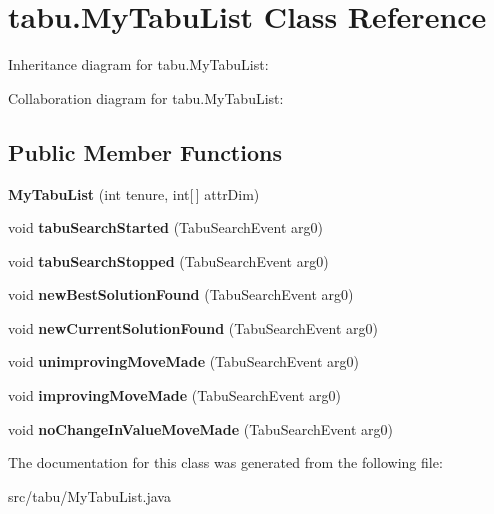 \hypertarget{classtabu_1_1_my_tabu_list}{}\section{tabu.\+My\+Tabu\+List Class Reference}
\label{classtabu_1_1_my_tabu_list}


Inheritance diagram for tabu.\+My\+Tabu\+List\+:


Collaboration diagram for tabu.\+My\+Tabu\+List\+:
\subsection*{Public Member Functions}
\begin{DoxyCompactItemize}
\item 
{\bfseries My\+Tabu\+List} (int tenure, int\mbox{[}$\,$\mbox{]} attr\+Dim)\hypertarget{classtabu_1_1_my_tabu_list_a2dbf5a25966852f04901f963e53a556f}{}\label{classtabu_1_1_my_tabu_list_a2dbf5a25966852f04901f963e53a556f}

\item 
void {\bfseries tabu\+Search\+Started} (Tabu\+Search\+Event arg0)\hypertarget{classtabu_1_1_my_tabu_list_a5c320a69d2ebd5521b5d341af99e1e30}{}\label{classtabu_1_1_my_tabu_list_a5c320a69d2ebd5521b5d341af99e1e30}

\item 
void {\bfseries tabu\+Search\+Stopped} (Tabu\+Search\+Event arg0)\hypertarget{classtabu_1_1_my_tabu_list_a9600db348f7fe71290c1f7c6c57c82bc}{}\label{classtabu_1_1_my_tabu_list_a9600db348f7fe71290c1f7c6c57c82bc}

\item 
void {\bfseries new\+Best\+Solution\+Found} (Tabu\+Search\+Event arg0)\hypertarget{classtabu_1_1_my_tabu_list_ae54aab895024d64e38fd474681611a7f}{}\label{classtabu_1_1_my_tabu_list_ae54aab895024d64e38fd474681611a7f}

\item 
void {\bfseries new\+Current\+Solution\+Found} (Tabu\+Search\+Event arg0)\hypertarget{classtabu_1_1_my_tabu_list_a817e0fe53bad698c0cfc9fd367bb0ff4}{}\label{classtabu_1_1_my_tabu_list_a817e0fe53bad698c0cfc9fd367bb0ff4}

\item 
void {\bfseries unimproving\+Move\+Made} (Tabu\+Search\+Event arg0)\hypertarget{classtabu_1_1_my_tabu_list_a6771c11d74fbdf5d86b63ea38e03158f}{}\label{classtabu_1_1_my_tabu_list_a6771c11d74fbdf5d86b63ea38e03158f}

\item 
void {\bfseries improving\+Move\+Made} (Tabu\+Search\+Event arg0)\hypertarget{classtabu_1_1_my_tabu_list_a0be67d25b676773967761649405325d4}{}\label{classtabu_1_1_my_tabu_list_a0be67d25b676773967761649405325d4}

\item 
void {\bfseries no\+Change\+In\+Value\+Move\+Made} (Tabu\+Search\+Event arg0)\hypertarget{classtabu_1_1_my_tabu_list_af2d27ec37cfbe0e2d8ac210c0e79e439}{}\label{classtabu_1_1_my_tabu_list_af2d27ec37cfbe0e2d8ac210c0e79e439}

\end{DoxyCompactItemize}


The documentation for this class was generated from the following file\+:\begin{DoxyCompactItemize}
\item 
src/tabu/My\+Tabu\+List.\+java\end{DoxyCompactItemize}
